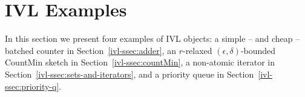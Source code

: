 \section{IVL Examples}
\label{ivl-sec:examples}

In this section we present four examples of IVL objects: a simple -- and
cheap -- batched counter in Section~\ref{ivl-ssec:adder}, an $r$-relaxed
$(\epsilon, \delta)$-bounded CountMin sketch in Section~\ref{ivl-ssec:countMin},
a non-atomic iterator in Section~\ref{ivl-ssec:sets-and-iterators}, and
a priority queue in Section~\ref{ivl-ssec:priority-q}.







